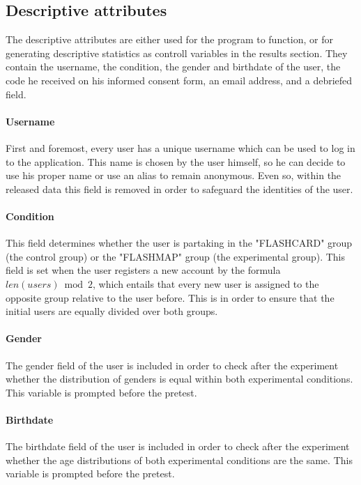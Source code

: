 \subsection{Descriptive attributes}

The descriptive attributes are either used for the program to function, or for generating descriptive statistics as controll variables in the results section. They contain the username, the condition, the gender and birthdate of the user, the code he received on his informed consent form, an email address, and a debriefed field.

\paragraph{Username} First and foremost, every user has a unique username which can be used to log in to the application. This name is chosen by the user himself, so he can decide to use his proper name or use an alias to remain anonymous. Even so, within the released data this field is removed in order to safeguard the identities of the user.

\paragraph{Condition} This field determines whether the user is partaking in the "FLASHCARD" group (the control group) or the "FLASHMAP" group (the experimental group). This field is set when the user registers a new account by the formula $len(users) \bmod 2$, which entails that every new user is assigned to the opposite group relative to the user before. This is in order to ensure that the initial users are equally divided over both groups.

\paragraph{Gender} The gender field of the user is included in order to check after the experiment whether the distribution of genders is equal within both experimental conditions. This variable is prompted before the pretest.

\paragraph{Birthdate} The birthdate field of the user is included in order to check after the experiment whether the age distributions of both experimental conditions are the same. This variable is prompted before the pretest.

